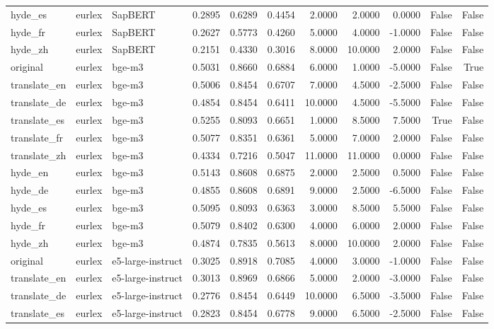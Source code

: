 \begin{tabular}{lllrrrrrrrr}
hyde\_es & eurlex & SapBERT & 0.2895 & 0.6289 & 0.4454 & 2.0000 & 2.0000 & 0.0000 & False & False \\
hyde\_fr & eurlex & SapBERT & 0.2627 & 0.5773 & 0.4260 & 5.0000 & 4.0000 & -1.0000 & False & False \\
hyde\_zh & eurlex & SapBERT & 0.2151 & 0.4330 & 0.3016 & 8.0000 & 10.0000 & 2.0000 & False & False \\
original & eurlex & bge-m3 & 0.5031 & 0.8660 & 0.6884 & 6.0000 & 1.0000 & -5.0000 & False & True \\
translate\_en & eurlex & bge-m3 & 0.5006 & 0.8454 & 0.6707 & 7.0000 & 4.5000 & -2.5000 & False & False \\
translate\_de & eurlex & bge-m3 & 0.4854 & 0.8454 & 0.6411 & 10.0000 & 4.5000 & -5.5000 & False & False \\
translate\_es & eurlex & bge-m3 & 0.5255 & 0.8093 & 0.6651 & 1.0000 & 8.5000 & 7.5000 & True & False \\
translate\_fr & eurlex & bge-m3 & 0.5077 & 0.8351 & 0.6361 & 5.0000 & 7.0000 & 2.0000 & False & False \\
translate\_zh & eurlex & bge-m3 & 0.4334 & 0.7216 & 0.5047 & 11.0000 & 11.0000 & 0.0000 & False & False \\
hyde\_en & eurlex & bge-m3 & 0.5143 & 0.8608 & 0.6875 & 2.0000 & 2.5000 & 0.5000 & False & False \\
hyde\_de & eurlex & bge-m3 & 0.4855 & 0.8608 & 0.6891 & 9.0000 & 2.5000 & -6.5000 & False & False \\
hyde\_es & eurlex & bge-m3 & 0.5095 & 0.8093 & 0.6363 & 3.0000 & 8.5000 & 5.5000 & False & False \\
hyde\_fr & eurlex & bge-m3 & 0.5079 & 0.8402 & 0.6300 & 4.0000 & 6.0000 & 2.0000 & False & False \\
hyde\_zh & eurlex & bge-m3 & 0.4874 & 0.7835 & 0.5613 & 8.0000 & 10.0000 & 2.0000 & False & False \\
original & eurlex & e5-large-instruct & 0.3025 & 0.8918 & 0.7085 & 4.0000 & 3.0000 & -1.0000 & False & False \\
translate\_en & eurlex & e5-large-instruct & 0.3013 & 0.8969 & 0.6866 & 5.0000 & 2.0000 & -3.0000 & False & False \\
translate\_de & eurlex & e5-large-instruct & 0.2776 & 0.8454 & 0.6449 & 10.0000 & 6.5000 & -3.5000 & False & False \\
translate\_es & eurlex & e5-large-instruct & 0.2823 & 0.8454 & 0.6778 & 9.0000 & 6.5000 & -2.5000 & False & False \\

\end{tabular}
